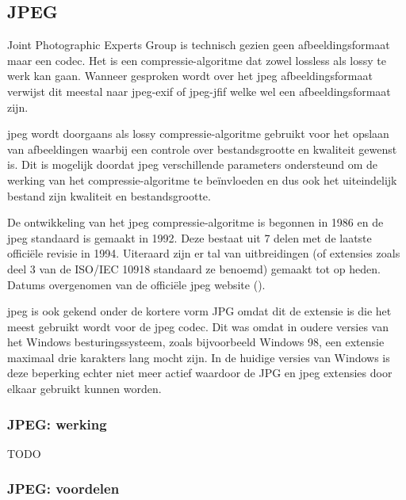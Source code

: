 \subsection{JPEG}
\label{sec:afbeeldingscompressie-jpeg}

Joint Photographic Experts Group is technisch gezien geen \gls{afbeeldingsformaat} maar een \gls{codec}. Het is een \gls{compressie-algoritme} dat zowel \gls{lossless} als \gls{lossy} te werk kan gaan. Wanneer gesproken wordt over het \gls{jpeg} \gls{afbeeldingsformaat} verwijst dit meestal naar \gls{jpeg-exif} of \gls{jpeg-jfif} welke wel een \gls{afbeeldingsformaat} zijn.

\gls{jpeg} wordt doorgaans als \gls{lossy} \gls{compressie-algoritme} gebruikt voor het opslaan van afbeeldingen waarbij een controle over bestandsgrootte en kwaliteit gewenst is. Dit is mogelijk doordat \gls{jpeg} verschillende parameters ondersteund om de werking van het \gls{compressie-algoritme} te beïnvloeden en dus ook het uiteindelijk bestand zijn kwaliteit en bestandsgrootte.

De ontwikkeling van het \gls{jpeg} \gls{compressie-algoritme} is begonnen in 1986 en de \gls{jpeg} standaard is gemaakt in 1992. Deze bestaat uit 7 delen met de laatste officiële revisie in 1994. Uiteraard zijn er tal van uitbreidingen (of extensies zoals deel 3 van de ISO/IEC 10918 standaard ze benoemd) gemaakt tot op heden. Datums overgenomen van de officiële \gls{jpeg} website (\cite{jpegorg}). 

\gls{jpeg} is ook gekend onder de kortere vorm JPG omdat dit de extensie is die het meest gebruikt wordt voor de \gls{jpeg} \gls{codec}. Dit was omdat in oudere versies van het Windows besturingssysteem, zoals bijvoorbeeld Windows 98, een \gls{extensie} maximaal drie karakters lang mocht zijn. In de huidige versies van Windows is deze beperking echter niet meer actief waardoor de JPG en \gls{jpeg} \glspl{extensie} door elkaar gebruikt kunnen worden.

\subsubsection{JPEG: werking}
\label{sec:afbeeldingscompressie-jpeg-werking}

TODO

\subsubsection{JPEG: voordelen}
\label{sec:afbeeldingscompressie-jpeg-voordelen}

